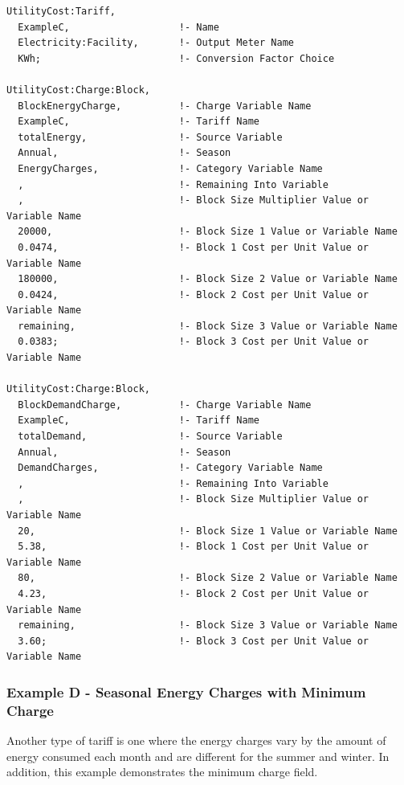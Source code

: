 \begin{lstlisting}
UtilityCost:Tariff,
  ExampleC,                   !- Name
  Electricity:Facility,       !- Output Meter Name
  KWh;                        !- Conversion Factor Choice

UtilityCost:Charge:Block,
  BlockEnergyCharge,          !- Charge Variable Name
  ExampleC,                   !- Tariff Name
  totalEnergy,                !- Source Variable
  Annual,                     !- Season
  EnergyCharges,              !- Category Variable Name
  ,                           !- Remaining Into Variable
  ,                           !- Block Size Multiplier Value or Variable Name
  20000,                      !- Block Size 1 Value or Variable Name
  0.0474,                     !- Block 1 Cost per Unit Value or Variable Name
  180000,                     !- Block Size 2 Value or Variable Name
  0.0424,                     !- Block 2 Cost per Unit Value or Variable Name
  remaining,                  !- Block Size 3 Value or Variable Name
  0.0383;                     !- Block 3 Cost per Unit Value or Variable Name

UtilityCost:Charge:Block,
  BlockDemandCharge,          !- Charge Variable Name
  ExampleC,                   !- Tariff Name
  totalDemand,                !- Source Variable
  Annual,                     !- Season
  DemandCharges,              !- Category Variable Name
  ,                           !- Remaining Into Variable
  ,                           !- Block Size Multiplier Value or Variable Name
  20,                         !- Block Size 1 Value or Variable Name
  5.38,                       !- Block 1 Cost per Unit Value or Variable Name
  80,                         !- Block Size 2 Value or Variable Name
  4.23,                       !- Block 2 Cost per Unit Value or Variable Name
  remaining,                  !- Block Size 3 Value or Variable Name
  3.60;                       !- Block 3 Cost per Unit Value or Variable Name
\end{lstlisting}

\subsubsection{Example D - Seasonal Energy Charges with Minimum Charge}\label{example-d---seasonal-energy-charges-with-minimum-charge}

Another type of tariff is one where the energy charges vary by the amount of energy consumed each month and are different for the summer and winter. In addition, this example demonstrates the minimum charge field.

